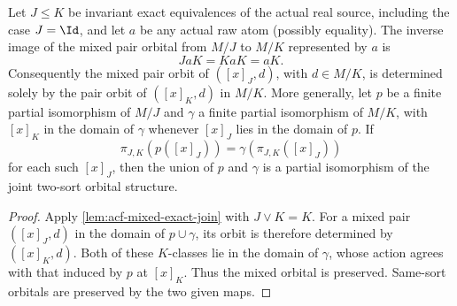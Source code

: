 \begin{lemma}
\label{lem:nested-mixed}
Let $J\le K$ be invariant exact equivalences of the actual real
source, including the case $J=\Id$, and let $a$ be any actual raw
atom (possibly equality).  The inverse image of the mixed pair
orbital from $M/J$ to $M/K$ represented by $a$ is
\[
          JaK=KaK=aK.
\]
Consequently the mixed pair orbit of $([x]_J,d)$, with
$d\in M/K$, is determined solely by the pair orbit of
$([x]_K,d)$ in $M/K$.  More generally, let $p$ be a finite partial
isomorphism of $M/J$ and $\gamma$ a finite partial isomorphism
of $M/K$, with $[x]_K$ in the domain of $\gamma$ whenever
$[x]_J$ lies in the domain of $p$.  If
\[
             \pi_{J,K}(p([x]_J))
                 =\gamma(\pi_{J,K}([x]_J))
\]
for each such $[x]_J$, then the union of $p$ and $\gamma$ is a
partial isomorphism of the joint two-sort orbital structure.
\end{lemma}
\begin{proof}
Apply \cref{lem:acf-mixed-exact-join} with $J\vee K=K$.
For a mixed pair $([x]_J,d)$ in the domain of $p\cup\gamma$,
its orbit is therefore determined by $([x]_K,d)$. Both of these
$K$-classes lie in the domain of $\gamma$, whose action agrees
with that induced by $p$ at $[x]_K$. Thus the mixed orbital is
preserved. Same-sort orbitals are preserved by the two given maps.
\end{proof}

